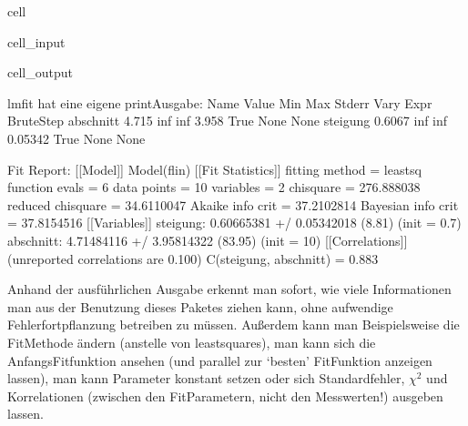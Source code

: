 \documentclass[letterpaper,10pt,english]{jupyterBook}
\begin{document}
\begin{sphinxuseclass}{cell}
\begin{sphinxVerbatimInput}
\begin{sphinxuseclass}{cell_input}
\begin{sphinxVerbatim}[commandchars=\\\{\}]
\end{sphinxVerbatim}

\end{sphinxuseclass}\end{sphinxVerbatimInput}
\begin{sphinxVerbatimOutput}

\begin{sphinxuseclass}{cell_output}
\begin{sphinxVerbatim}[commandchars=\\\{\}]
lmfit hat eine eigene print\PYGZhy{}Ausgabe:
Name          Value      Min      Max   Stderr     Vary     Expr Brute\PYGZus{}Step
abschnitt     4.715     \PYGZhy{}inf      inf    3.958     True     None     None
steigung     0.6067     \PYGZhy{}inf      inf  0.05342     True     None     None

Fit Report:
[[Model]]
    Model(f\PYGZus{}lin)
[[Fit Statistics]]
    \PYGZsh{} fitting method   = leastsq
    \PYGZsh{} function evals   = 6
    \PYGZsh{} data points      = 10
    \PYGZsh{} variables        = 2
    chi\PYGZhy{}square         = 276.888038
    reduced chi\PYGZhy{}square = 34.6110047
    Akaike info crit   = 37.2102814
    Bayesian info crit = 37.8154516
[[Variables]]
    steigung:   0.60665381 +/\PYGZhy{} 0.05342018 (8.81\PYGZpc{}) (init = 0.7)
    abschnitt:  4.71484116 +/\PYGZhy{} 3.95814322 (83.95\PYGZpc{}) (init = 10)
[[Correlations]] (unreported correlations are \PYGZlt{} 0.100)
    C(steigung, abschnitt) = \PYGZhy{}0.883
\end{sphinxVerbatim}

\noindent{}

\end{sphinxuseclass}\end{sphinxVerbatimOutput}

\end{sphinxuseclass}
\sphinxAtStartPar
Anhand der ausführlichen Ausgabe erkennt man sofort, wie viele Informationen man aus der Benutzung dieses Paketes ziehen kann, ohne aufwendige Fehlerfortpflanzung betreiben zu müssen. Außerdem kann man Beispielsweise die Fit\sphinxhyphen{}Methode ändern (anstelle von least\sphinxhyphen{}squares), man kann sich die Anfangs\sphinxhyphen{}Fitfunktion ansehen (und parallel zur ‘besten’ Fit\sphinxhyphen{}Funktion anzeigen lassen), man kann Parameter konstant setzen oder sich Standardfehler, \(\chi^2\) und Korrelationen (zwischen den Fit\sphinxhyphen{}Parametern, nicht den Messwerten!) ausgeben lassen.
\end{document}
